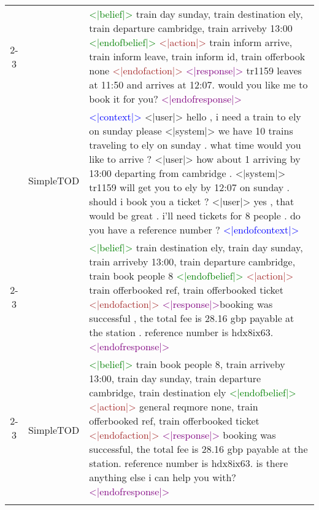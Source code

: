 \documentclass{article}
\begin{document}
\begin{table}[htb!]
\begin{tabular}{c|c|p{10cm}}
    \cline{2-3}
    & \multirow{3}{*}{SimpleTOD} & \textcolor{green}{<|belief|>} train day sunday, train destination ely, train departure cambridge, train arriveby 13:00 \textcolor{green}{<|endofbelief|>} \textcolor{brown}{<|action|>} train inform arrive, train inform leave, train inform id, train offerbook none \textcolor{brown}{<|endofaction|>} \textcolor{purple}{<|response|>} tr1159 leaves at 11:50 and arrives at 12:07. would you like me to book it for you? \textcolor{purple}{<|endofresponse|>}
    \\
\specialrule{.3em}{.2em}{.2em}
    \multirow{14}{*}{\textbf{Turn 3}} & \multirow{4}{*}{Context} & \textcolor{blue}{<|context|>} \textcolor{TealBlue}{<|user|>} hello , i need a train to ely on sunday please \textcolor{Periwinkle}{<|system|>} we have 10 trains traveling to ely on sunday . what time would you like to arrive ? \textcolor{TealBlue}{<|user|>} how about 1 arriving by 13:00 departing from cambridge . \textcolor{Periwinkle}{<|system|>} tr1159 will get you to ely by 12:07 on sunday . should i book you a ticket ? \textcolor{TealBlue}{<|user|>} yes , that would be great . i'll need tickets for 8 people . do you have a reference number ? \textcolor{blue}{<|endofcontext|>} \\
    \cline{2-3}
    & \multirow{4}{*}{Target} & \textcolor{green}{<|belief|>} train destination ely, train day sunday, train arriveby 13:00, train departure cambridge, train book people 8 \textcolor{green}{<|endofbelief|>} \textcolor{brown}{<|action|>} train offerbooked ref, train offerbooked ticket \textcolor{brown}{<|endofaction|>} \textcolor{purple}{<|response|>}booking was successful , the total fee is 28.16 gbp payable at the station . reference number is hdx8ix63. \textcolor{purple}{<|endofresponse|>}\\
    \cline{2-3}
     & \multirow{3}{*}{SimpleTOD} & \textcolor{green}{<|belief|>} train book people 8, train arriveby 13:00, train day sunday, train departure cambridge, train destination ely \textcolor{green}{<|endofbelief|>} \textcolor{brown}{<|action|>} general reqmore none, train offerbooked ref, train offerbooked ticket \textcolor{brown}{<|endofaction|>} \textcolor{purple}{<|response|>} booking was successful, the total fee is 28.16 gbp payable at the station. reference number is hdx8ix63. is there anything else i can help you with? \textcolor{purple}{<|endofresponse|>} \\
\specialrule{.3em}{.2em}{.2em}

\end{tabular}
\end{table}
\end{document}
